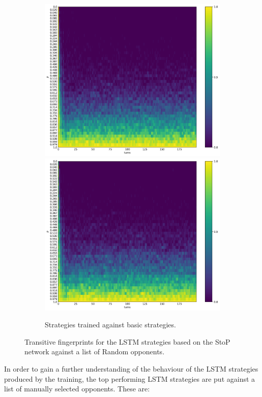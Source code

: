 \begin{figure}[!htbp]
\begin{subfigure}{\textwidth}
        \includegraphics[width=.3\textwidth]{src/chapters/07/img/default_basic_classification_1.pdf}
        \includegraphics[width=.3\textwidth]{src/chapters/07/img/default_basic_classification_0_78.pdf}
        \caption{Strategies trained against basic strategies.}
    \end{subfigure}
    \caption{Transitive fingerprints for the LSTM strategies based on the StoP
    network against a list of Random opponents.}\label{fig:transitive_fingerprints_default_s_to_p}
\end{figure}

In order to gain a further understanding of the behaviour of the LSTM strategies
produced by the training, the top performing LSTM strategies are put against a
list of manually selected opponents. These are:

